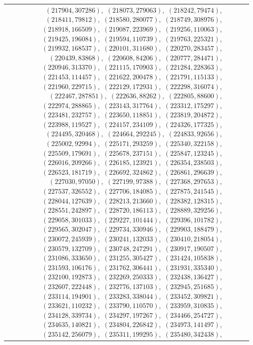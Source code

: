 \documentclass[11pt]{article}
\begin{document}
\begin{longtable}{@{}rrl>{\raggedright\arraybackslash}p{}@{}}
$(217904,307286)$,\allowbreak\ $(218073,279063)$,\allowbreak\ $(218242,79474)$,\allowbreak\ $(218411,79812)$,\allowbreak\ $(218580,280077)$,\allowbreak\ $(218749,308976)$,\allowbreak\ $(218918,166509)$,\allowbreak\ $(219087,223969)$,\allowbreak\ $(219256,110063)$,\allowbreak\ $(219425,196084)$,\allowbreak\ $(219594,110739)$,\allowbreak\ $(219763,225321)$,\allowbreak\ $(219932,168537)$,\allowbreak\ $(220101,311680)$,\allowbreak\ $(220270,283457)$,\allowbreak\ $(220439,83868)$,\allowbreak\ $(220608,84206)$,\allowbreak\ $(220777,284471)$,\allowbreak\ $(220946,313370)$,\allowbreak\ $(221115,170903)$,\allowbreak\ $(221284,228363)$,\allowbreak\ $(221453,114457)$,\allowbreak\ $(221622,200478)$,\allowbreak\ $(221791,115133)$,\allowbreak\ $(221960,229715)$,\allowbreak\ $(222129,172931)$,\allowbreak\ $(222298,316074)$,\allowbreak\ $(222467,287851)$,\allowbreak\ $(222636,88262)$,\allowbreak\ $(222805,88600)$,\allowbreak\ $(222974,288865)$,\allowbreak\ $(223143,317764)$,\allowbreak\ $(223312,175297)$,\allowbreak\ $(223481,232757)$,\allowbreak\ $(223650,118851)$,\allowbreak\ $(223819,204872)$,\allowbreak\ $(223988,119527)$,\allowbreak\ $(224157,234109)$,\allowbreak\ $(224326,177325)$,\allowbreak\ $(224495,320468)$,\allowbreak\ $(224664,292245)$,\allowbreak\ $(224833,92656)$,\allowbreak\ $(225002,92994)$,\allowbreak\ $(225171,293259)$,\allowbreak\ $(225340,322158)$,\allowbreak\ $(225509,179691)$,\allowbreak\ $(225678,237151)$,\allowbreak\ $(225847,123245)$,\allowbreak\ $(226016,209266)$,\allowbreak\ $(226185,123921)$,\allowbreak\ $(226354,238503)$,\allowbreak\ $(226523,181719)$,\allowbreak\ $(226692,324862)$,\allowbreak\ $(226861,296639)$,\allowbreak\ $(227030,97050)$,\allowbreak\ $(227199,97388)$,\allowbreak\ $(227368,297653)$,\allowbreak\ $(227537,326552)$,\allowbreak\ $(227706,184085)$,\allowbreak\ $(227875,241545)$,\allowbreak\ $(228044,127639)$,\allowbreak\ $(228213,213660)$,\allowbreak\ $(228382,128315)$,\allowbreak\ $(228551,242897)$,\allowbreak\ $(228720,186113)$,\allowbreak\ $(228889,329256)$,\allowbreak\ $(229058,301033)$,\allowbreak\ $(229227,101444)$,\allowbreak\ $(229396,101782)$,\allowbreak\ $(229565,302047)$,\allowbreak\ $(229734,330946)$,\allowbreak\ $(229903,188479)$,\allowbreak\ $(230072,245939)$,\allowbreak\ $(230241,132033)$,\allowbreak\ $(230410,218054)$,\allowbreak\ $(230579,132709)$,\allowbreak\ $(230748,247291)$,\allowbreak\ $(230917,190507)$,\allowbreak\ $(231086,333650)$,\allowbreak\ $(231255,305427)$,\allowbreak\ $(231424,105838)$,\allowbreak\ $(231593,106176)$,\allowbreak\ $(231762,306441)$,\allowbreak\ $(231931,335340)$,\allowbreak\ $(232100,192873)$,\allowbreak\ $(232269,250333)$,\allowbreak\ $(232438,136427)$,\allowbreak\ $(232607,222448)$,\allowbreak\ $(232776,137103)$,\allowbreak\ $(232945,251685)$,\allowbreak\ $(233114,194901)$,\allowbreak\ $(233283,338044)$,\allowbreak\ $(233452,309821)$,\allowbreak\ $(233621,110232)$,\allowbreak\ $(233790,110570)$,\allowbreak\ $(233959,310835)$,\allowbreak\ $(234128,339734)$,\allowbreak\ $(234297,197267)$,\allowbreak\ $(234466,254727)$,\allowbreak\ $(234635,140821)$,\allowbreak\ $(234804,226842)$,\allowbreak\ $(234973,141497)$,\allowbreak\ $(235142,256079)$,\allowbreak\ $(235311,199295)$,\allowbreak\ $(235480,342438)$,\allowbreak\ 
\end{longtable}
\end{document}
